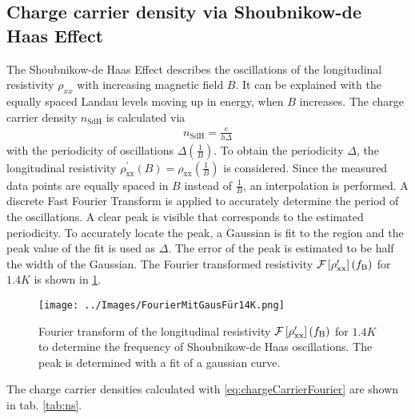 \subsection{Charge carrier density via Shoubnikow-de Haas Effect}
The Shoubnikow-de Haas Effect describes the oscillations of the longitudinal resistivity $\rho_{xx}$ with increasing magnetic field $B$.
It can be explained with the equally spaced Landau levels moving up in energy, when $B$ increases.
The charge carrier density $n_\text{SdH}$ is calculated via
\begin{align}
    n_\text{SdH} = \frac{e}{h\Delta}
    \label{eq:chargeCarrierFourier}
\end{align} 
with the periodicity of oscillations $\Delta\left(\frac{1}{B}\right)$.
To obtain the periodicity $\Delta$, the longitudinal resistivity $\rho^\prime_\text{xx}\left(B\right)=\rho_\text{xx}\left(\frac{1}{B}\right)$ is considered.
Since the measured data points are equally spaced in $B$ instead of $\frac{1}{B}$, an interpolation is performed.
A discrete Fast Fourier Transform is applied to accurately determine the period of the oscillations.
A clear peak is visible that corresponds to the estimated periodicity.
To accurately locate the peak, a Gaussian is fit to the region and the peak value of the fit is used as $\Delta$.
The error of the peak is estimated to be half the width of the Gaussian.
The Fourier transformed resistivity $\mathcal{F}\left[ \rho^\prime_\text{xx}\right]\left(f_\text B\right)$ for $1.4K$ is shown in \ref{fig:Fourier}.
\begin{figure}[h]
    \centering
    \texttt{[image: ../Images/FourierMitGausFür14K.png]}
    \caption{Fourier transform of the longitudinal resistivity 
    $\mathcal{F}\left[ \rho^\prime_\text{xx}\right]\left(f_\text B\right)$ 
    for $1.4K$ to determine the frequency of Shoubnikow-de Haas oscillations.
    The peak is determined with a fit of a gaussian curve.
    }
    \label{fig:Fourier}
\end{figure}
The charge carrier densities calculated with \ref{eq:chargeCarrierFourier} are shown in tab. \ref{tab:ns}.
